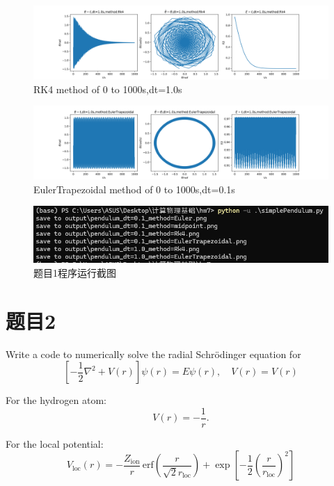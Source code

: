 \documentclass[11pt]{article}
\begin{document}
  \begin{figure}
    \centering
    \includegraphics[width=1.0\linewidth]{photo/pendulum_dt=1.0_method=Rk4.png}
    \caption{RK4 method of 0 to 1000s,dt=1.0s}
    \label{fig:5}
  \end{figure}

  \begin{figure}
    \centering
    \includegraphics[width=1.0\linewidth]{photo/pendulum_dt=1.0_method=EulerTrapezoidal.png}
    \caption{EulerTrapezoidal method of 0 to 1000s,dt=0.1s}
    \label{fig:6}
  \end{figure}

  \begin{figure}
    \centering
    \includegraphics[width=0.8\linewidth]{photo/figp1.png}
    \caption{题目1程序运行截图}
    \label{fig:7}
  \end{figure}
  
\section{题目2}
Write a code to numerically solve the radial Schrödinger equation for
\[
\left[ -\frac{1}{2} \nabla^2 + V(r) \right] \psi(r) = E \psi(r), \quad V(r) = V(r)
\]

For the hydrogen atom:
\[
V(r) = -\frac{1}{r}.
\]

For the local potential:
\[
V_{\text{loc}}(r) = -\frac{Z_{\text{ion}}}{r} \, \text{erf} \left( \frac{r}{\sqrt{2} r_{\text{loc}}} \right)
+ \exp \left[ -\frac{1}{2} \left( \frac{r}{r_{\text{loc}}} \right)^2 \right]
\]
\end{document}
